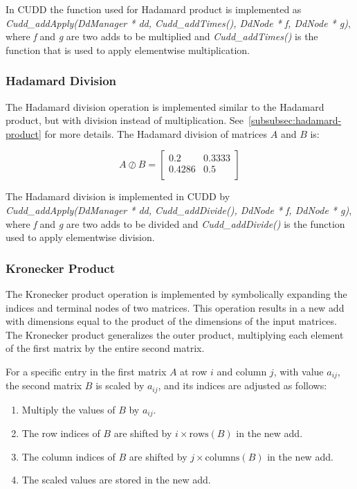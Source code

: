 In CUDD the function used for Hadamard product is implemented as \textit{Cudd\_addApply(DdManager * dd, Cudd\_addTimes(), DdNode * f, DdNode * g)}, where \textit{f} and \textit{g} are two \glspl{add} to be multiplied and \textit{Cudd\_addTimes()} is the function that is used to apply elementwise multiplication.

\subsubsection{Hadamard Division}
The Hadamard division operation is implemented similar to the Hadamard product, but with division instead of multiplication. 
See~\autoref{subsubsec:hadamard-product} for more details.
The Hadamard division of matrices $A$ and $B$ is:

\[
    A \oslash B = \begin{bmatrix}
        0.2    & 0.3333 \\
        0.4286 & 0.5    \\
    \end{bmatrix}
\]

The Hadamard division is implemented in CUDD by \textit{Cudd\_addApply(DdManager * dd, Cudd\_addDivide(), DdNode * f, DdNode * g)}, where \textit{f} and \textit{g} are two \glspl{add} to be divided and \textit{Cudd\_addDivide()} is the function used to apply elementwise division.

\subsubsection{Kronecker Product}\label{subsubsec:kronecker-product}
The Kronecker product operation is implemented by symbolically expanding the indices and terminal nodes of two matrices.
This operation results in a new \gls{add} with dimensions equal to the product of the dimensions of the input matrices. 
The Kronecker product generalizes the outer product, multiplying each element of the first matrix by the entire second matrix.

For a specific entry in the first matrix $A$ at row $i$ and column $j$, with value $a_{ij}$, the second matrix $B$ is scaled by $a_{ij}$, and its indices are adjusted as follows:

\begin{enumerate}
\item Multiply the values of $B$ by $a_{ij}$.
\item The row indices of $B$ are shifted by $i \times \text{rows}(B)$ in the new \gls{add}.
\item The column indices of $B$ are shifted by $j \times \text{columns}(B)$ in the new \gls{add}.
\item The scaled values are stored in the new \gls{add}.
\end{enumerate}

